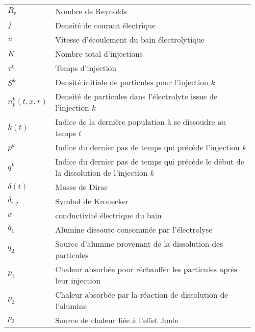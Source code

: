 \begin{tabularx}{\textwidth}{@{}ll@{}}
  $R_\mathrm{e}$ & Nombre de Reynolds \\
  $j$ & Densité de courant électrique \\
  $u$ & Vitesse d'écoulement du bain électrolytique \\
  $K$ & Nombre total d'injections \\
  $\tau^k$ & Temps d'injection \\
  $S^k$ & Densité initiale de particules pour l'injection $k$ \\
  $n_p^k(t, x, r)$ & Densité de particules dans l'électrolyte issue de l'injection $k$\\
  $\bar{k}(t)$ & Indice de la dernière population à se dissoudre au temps $t$ \\
  $p^k$ & Indice du dernier pas de temps qui précède l'injection $k$\\
  $q^k$ & Indice du dernier pas de temps qui précède le début de la dissolution de l'injection $k$\\
  $\delta(t)$ & Masse de Dirac \\
  $\delta_{i,j}$ & Symbol de Kronecker \\
  $\sigma$ & conductivité électrique du bain\\
  $q_1$ & Alumine dissoute consommée par l'électrolyse\\
  $q_2$ & Source d'alumine provenant de la dissolution des particules\\
  $p_1$ & Chaleur absorbée pour réchauffer les particules après leur injection\\
  $p_2$ & Chaleur absorbée par la réaction de dissolution de l'alumine\\
  $p_3$ & Source de chaleur liée à l'effet Joule\\
  \bottomrule
\end{tabularx}


